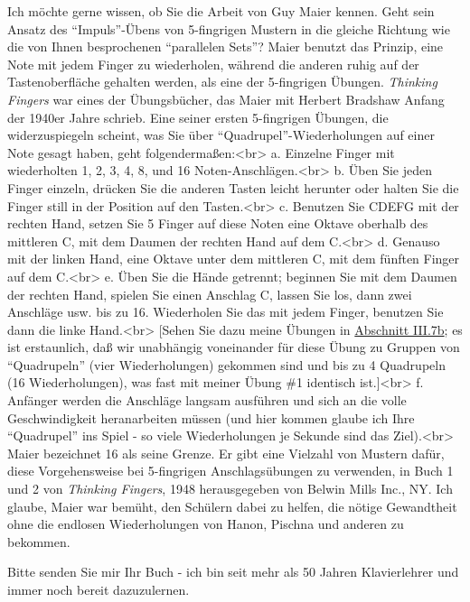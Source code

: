 \item \label{testimonials04}
Ich möchte gerne wissen, ob Sie die Arbeit von Guy Maier kennen.
Geht sein Ansatz des \enquote{Impuls}-Übens von 5-fingrigen Mustern in die gleiche Richtung wie die von Ihnen besprochenen \enquote{parallelen Sets}?
Maier benutzt das Prinzip, eine Note mit jedem Finger zu wiederholen, während die anderen ruhig auf der Tastenoberfläche gehalten werden, als eine der 5-fingrigen Übungen.
\textit{Thinking Fingers} war eines der Übungsbücher, das Maier mit Herbert Bradshaw Anfang der 1940er Jahre schrieb.
Eine seiner ersten 5-fingrigen Übungen, die widerzuspiegeln scheint, was Sie über \enquote{Quadrupel}-Wiederholungen auf einer Note gesagt haben, geht folgendermaßen:<br>
a. Einzelne Finger mit wiederholten 1, 2, 3, 4, 8, und 16 Noten-Anschlägen.<br>
b. Üben Sie jeden Finger einzeln, drücken Sie die anderen Tasten leicht herunter oder halten Sie die Finger still in der Position auf den Tasten.<br>
c. Benutzen Sie CDEFG mit der rechten Hand, setzen Sie 5 Finger auf diese Noten eine Oktave oberhalb des mittleren C, mit dem Daumen der rechten Hand auf dem C.<br>
d. Genauso mit der linken Hand, eine Oktave unter dem mittleren C, mit dem fünften Finger auf dem C.<br>
e. Üben Sie die Hände getrennt; beginnen Sie mit dem Daumen der rechten Hand, spielen Sie einen Anschlag C, lassen Sie los, dann zwei Anschläge usw. bis zu 16.
Wiederholen Sie das mit jedem Finger, benutzen Sie dann die linke Hand.<br>
[Sehen Sie dazu meine Übungen in \hyperref[c1iii7b]{Abschnitt III.7b}; es ist erstaunlich, daß wir unabhängig voneinander für diese Übung zu Gruppen von \enquote{Quadrupeln} (vier Wiederholungen) gekommen sind und bis zu 4 Quadrupeln (16 Wiederholungen), was fast mit meiner Übung \#1 identisch ist.]<br>
f. Anfänger werden die Anschläge langsam ausführen und sich an die volle Geschwindigkeit heranarbeiten müssen (und hier kommen glaube ich Ihre \enquote{Quadrupel} ins Spiel - so viele Wiederholungen je Sekunde sind das Ziel).<br> Maier bezeichnet 16 als seine Grenze.
Er gibt eine Vielzahl von Mustern dafür, diese Vorgehensweise bei 5-fingrigen Anschlagsübungen zu verwenden, in Buch 1 und 2 von \textit{Thinking Fingers}, 1948 herausgegeben von Belwin Mills Inc., NY.
Ich glaube, Maier war bemüht, den Schülern dabei zu helfen, die nötige Gewandtheit ohne die endlosen Wiederholungen von Hanon, Pischna und anderen zu bekommen.


\item \label{testimonials05}
Bitte senden Sie mir Ihr Buch - ich bin seit mehr als 50 Jahren Klavierlehrer und immer noch bereit dazuzulernen.


